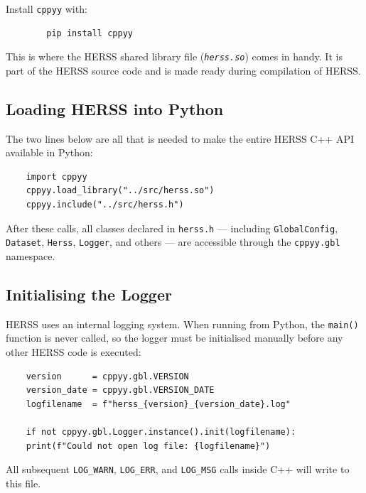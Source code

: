 \documentclass[a4paper, 12pt]{report}
\newcommand{\file}[1]{\textit{\texttt{#1}}}  %
\begin{document}
	Install \texttt{cppyy} with:
	\begin{verbatim}
		pip install cppyy
	\end{verbatim}

	\noindent This is where the HERSS shared library file (\file{herss.so}) comes in handy. It is part of the HERSS source code and is made ready during compilation of HERSS. 
	
	

	\subsection{Loading HERSS into Python}

	The two lines below are all that is needed to make the entire HERSS C++ API
	available in Python:

	\begin{verbatim}
	import cppyy
	cppyy.load_library("../src/herss.so")
	cppyy.include("../src/herss.h")
	\end{verbatim}

	After these calls, all classes declared in \texttt{herss.h} --- including
	\texttt{GlobalConfig}, \texttt{Dataset}, \texttt{Herss}, \texttt{Logger}, and
	others --- are accessible through the \texttt{cppyy.gbl} namespace.

	\subsection{Initialising the Logger}

	HERSS uses an internal logging system. When running from Python, the
	\texttt{main()} function is never called, so the logger must be initialised
	manually before any other HERSS code is executed:

	\begin{verbatim}
	version      = cppyy.gbl.VERSION
	version_date = cppyy.gbl.VERSION_DATE
	logfilename  = f"herss_{version}_{version_date}.log"
	
	if not cppyy.gbl.Logger.instance().init(logfilename):
	print(f"Could not open log file: {logfilename}")
	\end{verbatim}

	\noindent All subsequent \texttt{LOG\_WARN}, \texttt{LOG\_ERR}, and
	\texttt{LOG\_MSG} calls inside C++ will write to this file.

\end{document}
